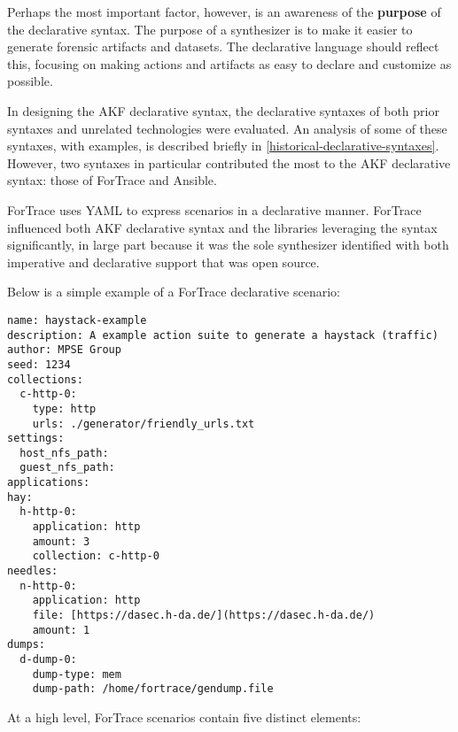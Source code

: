 \documentclass[letterpaper,12pt]{report}
\begin{document}
Perhaps the most important factor, however, is an awareness of the
\textbf{purpose} of the declarative syntax. The purpose of a synthesizer
is to make it easier to generate forensic artifacts and datasets. The
declarative language should reflect this, focusing on making actions and
artifacts as easy to declare and customize as possible.

In designing the AKF declarative syntax, the declarative syntaxes of
both prior syntaxes and unrelated technologies were evaluated. An
analysis of some of these syntaxes, with examples, is described briefly
in \autoref{historical-declarative-syntaxes}.
However, two syntaxes in particular contributed the most to the AKF
declarative syntax: those of ForTrace and Ansible.

ForTrace uses YAML to express scenarios in a declarative manner.
ForTrace influenced both AKF declarative syntax and the libraries
leveraging the syntax significantly, in large part because it was the
sole synthesizer identified with both imperative and declarative support
that was open source.

Below is a simple example of a ForTrace declarative scenario:

\begin{lstlisting}
name: haystack-example
description: A example action suite to generate a haystack (traffic)
author: MPSE Group
seed: 1234
collections:
  c-http-0:
    type: http
    urls: ./generator/friendly_urls.txt
settings:
  host_nfs_path:
  guest_nfs_path:
applications:
hay:
  h-http-0:
    application: http
    amount: 3
    collection: c-http-0
needles:
  n-http-0:
    application: http
    file: [https://dasec.h-da.de/](https://dasec.h-da.de/)
    amount: 1
dumps:
  d-dump-0:
    dump-type: mem
    dump-path: /home/fortrace/gendump.file
\end{lstlisting}

At a high level, ForTrace scenarios contain five distinct elements:
\end{document}
